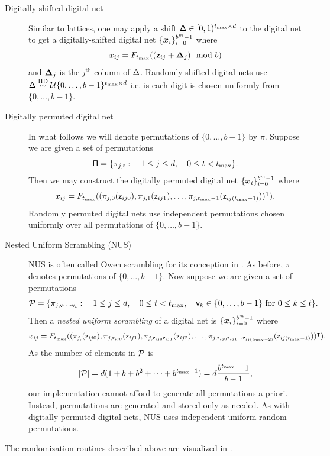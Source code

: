 \documentclass[acmsmall]{acmart}
\begin{document}
\begin{description}
    \item[Digitally-shifted digital net] Similar to lattices, one may apply a shift ${\mathsf{\Delta}} \in [0,1)^{t_\mathrm{max} \times d}$ to the digital net to get a digitally-shifted digital net $\{{\boldsymbol{x}}_i\}_{i=0}^{b^m-1}$ where 
    $$x_{ij} = F_{t_\mathrm{max}}(({\boldsymbol{\mathsf{z}}}_{ij} + {\boldsymbol{\Delta}}_j ) \mod b)$$
    and ${\boldsymbol{\Delta}}_j$ is the $j^\mathrm{th}$ column of ${\mathsf{\Delta}}$. Randomly shifted digital nets use ${\mathsf{\Delta}} \overset{\mathrm{IID}}{\sim} {\mathcal{U}}\{0,\dots,b-1\}^{t_\mathrm{max} \times d}$ i.e. is each digit is chosen uniformly from $\{0,\dots,b-1\}$. 
    \item[Digitally permuted digital net] In what follows we will denote permutations of $\{0,\dots,b-1\}$ by $\pi$. Suppose we are given a set of permutations
    $${\mathsf{\Pi}} = \{\pi_{j,t}: \quad 1 \leq j \leq d, \quad 0 \leq t < t_\mathrm{max}\}.$$
    Then we may construct the digitally permuted digital net $\{{\boldsymbol{x}}_i\}_{i=0}^{b^m-1}$ where 
    $$x_{ij} = F_{t_\mathrm{max}}((\pi_{j,0}({\mathsf{z}}_{ij0}),\pi_{j,1}({\mathsf{z}}_{ij1}),\dots,\pi_{j,t_\mathrm{max}-1}({\mathsf{z}}_{ij(t_\mathrm{max}-1)}))^\intercal).$$
    Randomly permuted digital nets use independent permutations chosen uniformly over all permutations of $\{0,\dots,b-1\}$. 
    \item[Nested Uniform Scrambling (NUS)] NUS is often called Owen scrambling for its conception in \citep{owen1995randomly}. As before, $\pi$ denotes permutations of $\{0,\dots,b-1\}$. Now suppose we are given a set of permutations 
    $${\mathcal{P}} = \{\pi_{j,{\mathsf{v}}_1\cdots{\mathsf{v}}_t}: \quad 1 \leq j \leq d, \quad 0 \leq t < t_\mathrm{max}, \quad {\mathsf{v}}_k \in \{0,\dots,b-1\} \text{ for } 0 \leq k \leq t \}.$$
    Then a \emph{nested uniform scrambling} of a digital net is $\{{\boldsymbol{x}}_i\}_{i=0}^{b^m-1}$ where
    $$x_{ij} = F_{t_\mathrm{max}}((\pi_{j,}({\mathsf{z}}_{ij0}),\pi_{j,{\mathsf{z}}_{ij0}}({\mathsf{z}}_{ij1}),\pi_{j,{\mathsf{z}}_{ij0}{\mathsf{z}}_{ij1}}({\mathsf{z}}_{ij2}),\dots,\pi_{j,{\mathsf{z}}_{ij0}{\mathsf{z}}_{ij1}\cdots{\mathsf{z}}_{ij(t_\mathrm{max}-2)}}({\mathsf{z}}_{ij(t_\mathrm{max}-1)}))^\intercal).$$ 
    As the number of elements in ${\mathcal{P}}$ is  
    $$\lvert {\mathcal{P}} \rvert = d(1+b+b^2+\dots+b^{t_\mathrm{max}-1}) = d \frac{b^{t_\mathrm{max}}-1}{b-1},$$ 
    our implementation cannot afford to generate all permutations a priori. Instead, permutations are generated and stored only as needed. As with digitally-permuted digital nets, NUS uses independent uniform random permutations.  
\end{description}
The randomization routines described above are visualized in . 
\end{document}
